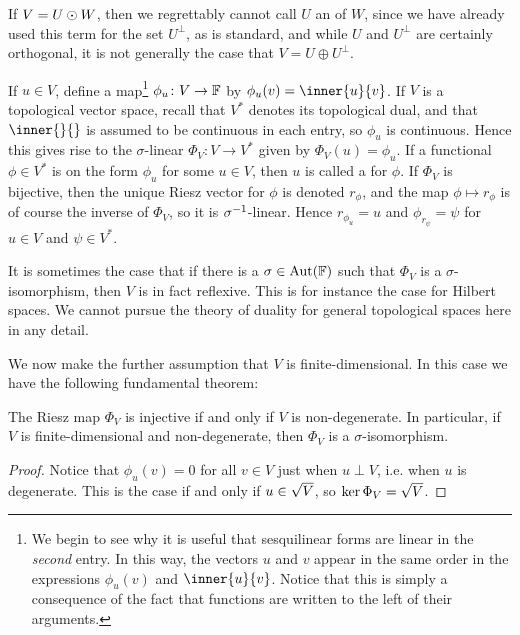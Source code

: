 If $V = U \odot W$, then we regrettably cannot call $U$ an  of $W$, since we have already used this term for the set $U^\perp$, as is standard, and while $U$ and $U^\perp$ are certainly orthogonal, it is not generally the case that $V = U \oplus U^\perp$.


If $u \in V$, define a map\footnote{We begin to see why it is useful that sesquilinear forms are linear in the \emph{second} entry. In this way, the vectors $u$ and $v$ appear in the same order in the expressions $\phi_u(v)$ and $\inner{u}{v}$. Notice that this is simply a consequence of the fact that functions are written to the left of their arguments.} $\phi_u \colon V \to \fieldF$ by $\phi_u(v) = \inner{u}{v}$. If $V$ is a topological vector space, recall that $V^*$ denotes its topological dual, and that $\inner{}{}$ is assumed to be continuous in each entry, so $\phi_u$ is continuous. Hence this gives rise to the $\sigma$-linear  $\Phi_V \colon V \to V^*$ given by $\Phi_V(u) = \phi_u$. If a functional $\phi \in V^*$ is on the form $\phi_u$ for some $u \in V$, then $u$ is called a  for $\phi$. If $\Phi_V$ is bijective, then the unique Riesz vector for $\phi$ is denoted $r_\phi$, and the map $\phi \mapsto r_\phi$ is of course the inverse of $\Phi_V$, so it is $\sigma^{-1}$-linear. Hence $r_{\phi_u} = u$ and $\phi_{r_\psi} = \psi$ for $u \in V$ and $\psi \in V^*$.

It is sometimes the case that if there is a $\sigma \in \mathrm{Aut}(\mathbb{F})$ such that $\Phi_V$ is a $\sigma$-isomorphism, then $V$ is in fact reflexive. This is for instance the case for Hilbert spaces. We cannot pursue the theory of duality for general topological spaces here in any detail.


We now make the further assumption that $V$ is finite-dimensional. In this case we have the following fundamental theorem:

\begin{theorem}
    \label{thm:Riesz-representation-theorem}
    The Riesz map $\Phi_V$ is injective if and only if $V$ is non-degenerate. In particular, if $V$ is finite-dimensional and non-degenerate, then $\Phi_V$ is a $\sigma$-isomorphism.
\end{theorem}

\begin{proof}
    Notice that $\phi_u(v) = 0$ for all $v \in V$ just when $u \perp V$, i.e. when $u$ is degenerate. This is the case if and only if $u \in \sqrt{V}$, so $\ker \Phi_V = \sqrt{V}$.
\end{proof}


